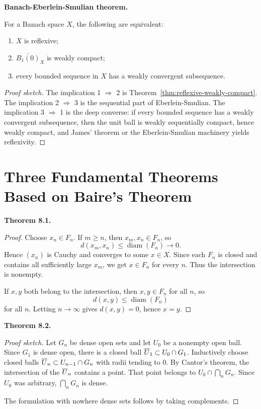 \documentclass[11pt]{article}
\newcommand{\Ball}{\overline{B_1(0)}}
\newenvironment{theoremstmt}[1]{%
  \par\medskip\noindent\textbf{Theorem #1. }\itshape
}{\par\medskip}
\newenvironment{namedstmt}[1]{%
  \par\medskip\noindent\textbf{#1. }\itshape
}{\par\medskip}
\begin{document}
\begin{namedstmt}{Banach-Eberlein-Smulian theorem}
For a Banach space $X$, the following are equivalent:
\begin{enumerate}
\item $X$ is reflexive;
\item $\Ball_X$ is weakly compact;
\item every bounded sequence in $X$ has a weakly convergent subsequence.
\end{enumerate}
\end{namedstmt}

\begin{proof}[Proof sketch]
The implication 1 $\Rightarrow$ 2 is Theorem~\ref{thm:reflexive-weakly-compact}. The implication 2 $\Rightarrow$ 3 is the sequential part of Eberlein-Smulian. The implication 3 $\Rightarrow$ 1 is the deep converse: if every bounded sequence has a weakly convergent subsequence, then the unit ball is weakly sequentially compact, hence weakly compact, and James' theorem or the Eberlein-Smulian machinery yields reflexivity.
\end{proof}

\section{Three Fundamental Theorems Based on Baire's Theorem}

\begin{theoremstmt}{8.1}
\thmCantorIntersection
\end{theoremstmt}

\begin{proof}
Choose $x_n\in F_n$. If $m\ge n$, then $x_m,x_n\in F_n$, so
\[
d(x_m,x_n)\le \operatorname{diam}(F_n)\to 0.
\]
Hence $(x_n)$ is Cauchy and converges to some $x\in X$. Since each $F_n$ is closed and contains all sufficiently large $x_m$, we get $x\in F_n$ for every $n$. Thus the intersection is nonempty.

If $x,y$ both belong to the intersection, then $x,y\in F_n$ for all $n$, so
\[
d(x,y)\le \operatorname{diam}(F_n)
\]
for all $n$. Letting $n\to\infty$ gives $d(x,y)=0$, hence $x=y$.
\end{proof}

\begin{theoremstmt}{8.2}
\thmBaireCategory
\end{theoremstmt}

\begin{proof}[Proof sketch]
Let $G_n$ be dense open sets and let $U_0$ be a nonempty open ball. Since $G_1$ is dense open, there is a closed ball $\overline{U}_1\subset U_0\cap G_1$. Inductively choose closed balls $\overline{U}_n\subset U_{n-1}\cap G_n$ with radii tending to $0$. By Cantor's theorem, the intersection of the $\overline{U}_n$ contains a point. That point belongs to $U_0\cap \bigcap_n G_n$. Since $U_0$ was arbitrary, $\bigcap_n G_n$ is dense.

The formulation with nowhere dense sets follows by taking complements.
\end{proof}
\end{document}
